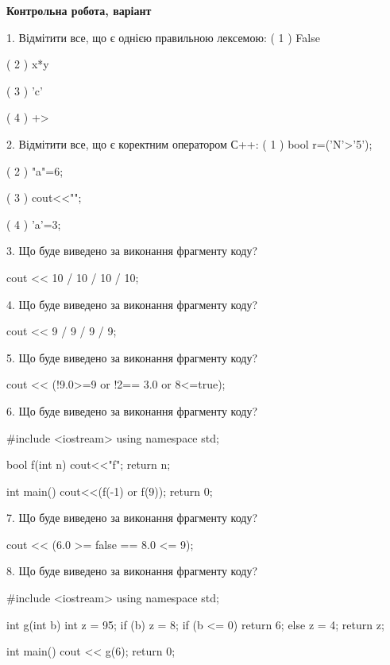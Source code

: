 \documentclass[11pt, ukrainian]{article}
\begin{document}
\begin{large}
\textbf{Контрольна робота, варіант }\par

1. Відмітити все, що є однією правильною лексемою:
( 1 ) False

( 2 ) x*y

( 3 ) 'c'

( 4 ) +>


2. Відмітити все, що є коректним оператором С++:
( 1 ) bool r=('N'>'5');

( 2 ) "a"=6;

( 3 ) cout<<"\n";

( 4 ) 'a'=3;


3. Що буде виведено за виконання фрагменту коду?

cout << 10 / 10 / 10 / 10;


4. Що буде виведено за виконання фрагменту коду?

cout << 9 / 9 / 9 / 9;


5. Що буде виведено за виконання фрагменту коду?

cout << (!9.0>=9 or !2== 3.0 or 8<=true);


6. Що буде виведено за виконання фрагменту коду?

#include <iostream>
using namespace std;

bool f(int n){
    cout<<"f";
    return n;
}

int main(){
    cout<<(f(-1) or f(9));
    return 0;
}


7. Що буде виведено за виконання фрагменту коду?

cout << (6.0 >= false == 8.0 <= 9);


8. Що буде виведено за виконання фрагменту коду?

#include <iostream>
using namespace std;

int g(int b){
    int z = 95;
    if (b) 
        z = 8;
    if (b <= 0)
         return 6;
    else
         z = 4;
    return z;
}

int main(){
    cout << g(6);
    return 0;
}



\end{large}
\end{document}
